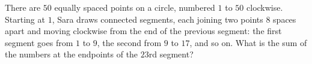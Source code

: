 There are $50$ equally spaced points on a circle, numbered $1$ to $50$ clockwise. Starting at $1$, Sara draws connected segments, each joining two points $8$ spaces apart and moving clockwise from the end of the previous segment: the first segment goes from $1$ to $9$, the second from $9$ to $17$, and so on. What is the sum of the numbers at the endpoints of the $23$rd segment?
